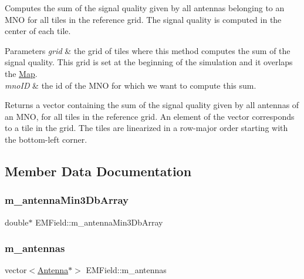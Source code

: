 Computes the sum of the signal quality given by all antennas belonging to an M\+NO for all tiles in the reference grid. The signal quality is computed in the center of each tile. 
\begin{DoxyParams}{Parameters}
{\em grid} & the grid of tiles where this method computes the sum of the signal quality. This grid is set at the beginning of the simulation and it overlaps the \mbox{\hyperlink{class_map}{Map}}. \\
\hline
{\em mno\+ID} & the id of the M\+NO for which we want to compute this sum. \\
\hline
\end{DoxyParams}
\begin{DoxyReturn}{Returns}
a vector containing the sum of the signal quality given by all antennas of an M\+NO, for all tiles in the reference grid. An element of the vector corresponds to a tile in the grid. The tiles are linearized in a row-\/major order starting with the bottom-\/left corner. 
\end{DoxyReturn}


\subsection{Member Data Documentation}
\mbox{\label{class_e_m_field_a96c4c7bc39c2f8afea0dca3280fe145c}} 
\subsubsection{\texorpdfstring{m\_antennaMin3DbArray}{m\_antennaMin3DbArray}}
{\footnotesize\ttfamily double$\ast$ E\+M\+Field\+::m\+\_\+antenna\+Min3\+Db\+Array\hspace{0.3cm}{\ttfamily [private]}}

\mbox{\label{class_e_m_field_ab74a3bde70b66fd033bde6c25345a755}} 
\subsubsection{\texorpdfstring{m\_antennas}{m\_antennas}}
{\footnotesize\ttfamily vector$<$\mbox{\hyperlink{class_antenna}{Antenna}}$\ast$$>$ E\+M\+Field\+::m\+\_\+antennas\hspace{0.3cm}{\ttfamily [private]}}

